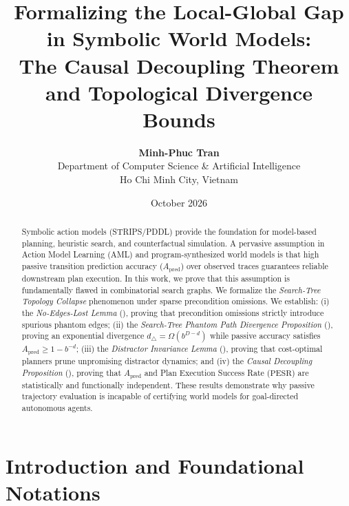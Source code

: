\documentclass[11pt,a4paper]{article}
\title{\textbf{Formalizing the Local-Global Gap in Symbolic World Models:\\The Causal Decoupling Theorem and Topological Divergence Bounds}}
\author{\textbf{Minh-Phuc Tran}\\
Department of Computer Science \& Artificial Intelligence\\
Ho Chi Minh City, Vietnam}
\date{October 2026}
\theoremstyle{definition}
\theoremstyle{remark}
\begin{document}
\maketitle

\begin{abstract}
Symbolic action models (STRIPS/PDDL) provide the foundation for model-based planning, heuristic search, and counterfactual simulation. A pervasive assumption in Action Model Learning (AML) and program-synthesized world models is that high passive transition prediction accuracy ($A_{\text{pred}}$) over observed traces guarantees reliable downstream plan execution. In this work, we prove that this assumption is fundamentally flawed in combinatorial search graphs. We formalize the \emph{Search-Tree Topology Collapse} phenomenon under sparse precondition omissions. We establish: (i) the \emph{No-Edges-Lost Lemma} (), proving that precondition omissions strictly introduce spurious phantom edges; (ii) the \emph{Search-Tree Phantom Path Divergence Proposition} (), proving an exponential divergence $d_\triangle = \Omega(b^{D-d})$ while passive accuracy satisfies $A_{\text{pred}} \ge 1 - b^{-d}$; (iii) the \emph{Distractor Invariance Lemma} (), proving that cost-optimal planners prune unpromising distractor dynamics; and (iv) the \emph{Causal Decoupling Proposition} (), proving that $A_{\text{pred}}$ and Plan Execution Success Rate ($\text{PESR}$) are statistically and functionally independent. These results demonstrate why passive trajectory evaluation is incapable of certifying world models for goal-directed autonomous agents.
\end{abstract}

\tableofcontents
\newpage

\section{Introduction and Foundational Notations}
\end{document}
